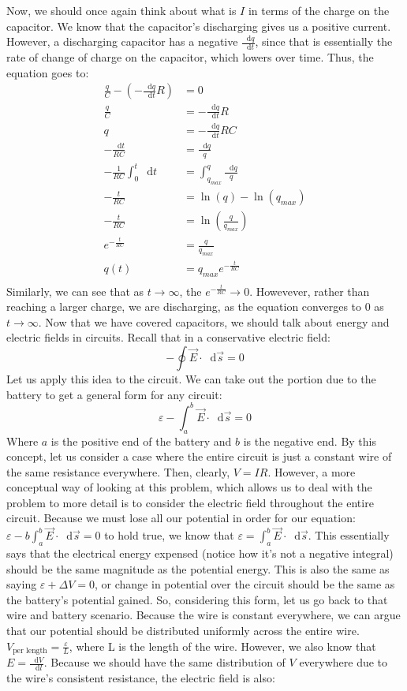 \documentclass{article}
\newcommand*\dif{\mathop{}\!\mathrm{d}}
\begin{document}
Now, we should once again think about what is $I$ in terms of the charge on the capacitor. We know that the capacitor's discharging gives us a positive current. However, a discharging capacitor has a negative $\frac{\dif q}{\dif t}$, since that is essentially the rate of change of charge on the capacitor, which lowers over time. Thus, the equation goes to:
\begin{align*}
\frac{q}{C} - (-\frac{\dif q}{\dif t}R) &= 0\\
\frac {q}{C} &= -\frac{\dif q}{\dif t}R \\
q &= -\frac{\dif q}{\dif t}RC \\
-\frac{\dif t}{RC} &= \frac{\dif q}{q} \\
-\frac{1}{RC}\int_0^t \dif t &= \int_{q_{max}}^q \frac{\dif q}{q} \\
-\frac{t}{RC} &= \ln(q) - \ln(q_{max})\\
-\frac{t}{RC} &= \ln(\frac{q}{q_{max}})\\
e^{-\frac{t}{RC}} &= \frac{q}{q_{max}}\\
q(t) &= q_{max}e^{-\frac{t}{RC}}\\
\end{align*} 
Similarly, we can see that as $t \rightarrow \infty$, the $e^{-\frac{t}{RC}} \rightarrow 0$. Howevever, rather than reaching a larger charge, we are discharging, as the equation converges to $0$ as $t\rightarrow \infty$. Now that we have covered capacitors, we should talk about energy and electric fields in circuits. Recall that in a conservative electric field:
$$-\oint \vec{E} \cdot \dif \vec{s} = 0$$
Let us apply this idea to the circuit. We can take out the portion due to the battery to get a general form for any circuit:
$$\varepsilon - \int_a^b \vec{E} \cdot \dif \vec{s} = 0$$
Where $a$ is the positive end of the battery and $b$ is the negative end. By this concept, let us consider a case where the entire circuit is just a constant wire of the same resistance everywhere. Then, clearly, $V = IR$. However, a more conceptual way of looking at this problem, which allows us to deal with the problem to more detail is to consider the electric field throughout the entire circuit. Because we must lose all our potential in order for our equation: $\varepsilon - b \int_a^b \vec{E} \cdot \dif \vec{s} = 0$ to hold true, we know that $\varepsilon = \int_a^b \vec{E} \cdot \dif \vec{s}$. This essentially says that the electrical energy expensed (notice how it's not a negative integral) should be the same magnitude as the potential energy. This is also the same as saying $\varepsilon + \Delta V = 0$, or change in potential over the circuit should be the same as the battery's potential gained. So, considering this form, let us go back to that wire and battery scenario. Because the wire is constant everywhere, we can argue that our potential should be distributed uniformly across the entire wire. $V_\text{per length} = \frac{\varepsilon}{L}$, where L is the length of the wire. However, we also know that $E = \frac{\dif V}{\dif l}$. Because we should have the same distribution of $V$ everywhere due to the wire's consistent resistance, the electric field is also:
\end{document}
